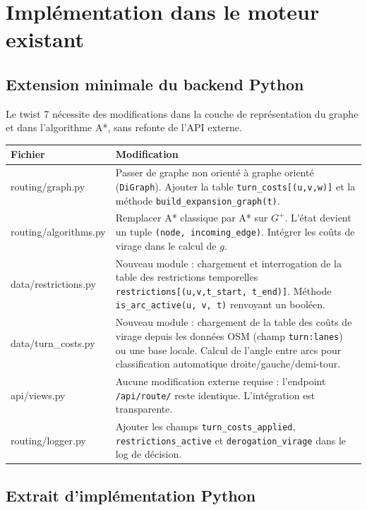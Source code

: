 \documentclass[12pt,a4paper]{article}
\theoremstyle{definition}
\theoremstyle{remark}
\begin{document}
\section{Implémentation dans le moteur existant}

\subsection{Extension minimale du backend Python}

Le twist 7 nécessite des modifications dans la couche de représentation
du graphe et dans l'algorithme A*, sans refonte de l'API externe.

\begin{center}
\begin{tabular}{>{\ttfamily}p{4.5cm} p{8.5cm}}
  \toprule
  \textbf{Fichier} & \textbf{Modification} \\
  \midrule
  routing/graph.py &
    Passer de graphe non orienté à graphe orienté (\texttt{DiGraph}).
    Ajouter la table \texttt{turn\_costs[(u,v,w)]} et la méthode
    \texttt{build\_expansion\_graph(t)}. \\[0.4em]
  routing/algorithms.py &
    Remplacer A* classique par A* sur $G^+$.
    L'état devient un tuple \texttt{(node, incoming\_edge)}.
    Intégrer les coûts de virage dans le calcul de $g$. \\[0.4em]
  data/restrictions.py &
    Nouveau module : chargement et interrogation de la table des
    restrictions temporelles \texttt{restrictions[(u,v,t\_start, t\_end)]}.
    Méthode \texttt{is\_arc\_active(u, v, t)} renvoyant un booléen. \\[0.4em]
  data/turn\_costs.py &
    Nouveau module : chargement de la table des coûts de virage
    depuis les données OSM (champ \texttt{turn:lanes}) ou une base
    locale. Calcul de l'angle entre arcs pour classification
    automatique droite/gauche/demi-tour. \\[0.4em]
  api/views.py &
    Aucune modification externe requise : l'endpoint \texttt{/api/route/}
    reste identique. L'intégration est transparente. \\[0.4em]
  routing/logger.py &
    Ajouter les champs \texttt{turn\_costs\_applied},
    \texttt{restrictions\_active} et \texttt{derogation\_virage}
    dans le log de décision. \\
  \bottomrule
\end{tabular}
\end{center}

\subsection{Extrait d'implémentation Python}
\end{document}
